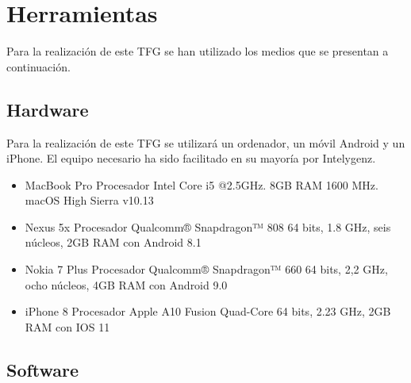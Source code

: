 \section{Herramientas}

Para la realización de este \acs{TFG} se han utilizado los medios que se presentan a continuación.

\subsection{Hardware}

Para la realización de este TFG se utilizará un ordenador, un móvil Android y un iPhone. El equipo 
necesario ha sido facilitado en su mayoría por Intelygenz.

\begin{itemize}
	\item MacBook Pro Procesador Intel Core i5 @2.5GHz. 8GB RAM 1600 MHz. macOS High Sierra v10.13
	\item Nexus 5x Procesador Qualcomm® Snapdragon™ 808 64 bits, 1.8 GHz, seis núcleos, 2GB RAM con Android 8.1
	\item Nokia 7 Plus Procesador Qualcomm® Snapdragon™ 660 64 bits, 2,2 GHz, ocho núcleos, 4GB RAM con Android 9.0
	\item iPhone 8 Procesador Apple A10 Fusion Quad-Core 64 bits, 2.23 GHz, 2GB RAM con IOS 11
\end{itemize}

\subsection{Software}

